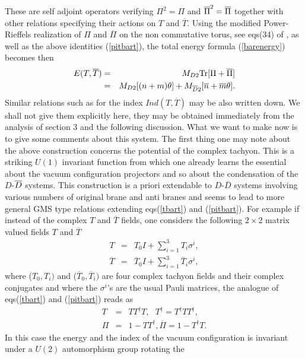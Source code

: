 \documentclass[a4paper,12pt]{article}
\begin{document}
These are self adjoint operators verifying $\Pi ^{2}=\Pi $ and $\overline{%
\Pi }^{2}=\overline{\Pi }$ together with other relations
specifying their actions on $T$ and $\overline{T}$. Using the
modified Power-Rieffels realization of $\Pi $ and $\overline{\Pi
}$ on the non commutative torus, see eqs(34) of \cite{g}, as well
as the above identities (\ref{pitbart}), the total energy formula
(\ref{barenergy}) becomes then
\begin{eqnarray*}
E(T,\overline{T}) &=&M_{D2}{\rm Tr}[\Pi +\overline{\Pi }] \\
&=&M_{D2}[(n+m)\theta
]+M_{\overline{D}2}[\overline{n}+\overline{m}\theta ].
\end{eqnarray*}
Similar relations such as for the index $Ind(T,\overline{T})$ may
be also written down. We shall not give them explicitly here, they
may be obtained immediately from the analysis of section 3 and the
following discussion. What we want to make now is to give some
comments about this system. The first thing one may note about the
above construction concerns the potential of the complex tachyon.
This is a striking $U(1)$ invariant function from which one
already learns the essential about the vacuum
configuration projectors and so about the condensation of the $D$-$\overline{%
D}$ systems. This construction is a priori extendable to
$D$-$\overline{D}$ systems involving various numbers of original
brane and anti branes and seems to lead to more general GMS type
relations extending eqs(\ref{tbart}) and (\ref{pitbart}). For
example if instead of the complex $T$ and $\overline{T}$ fields,
one
considers the following $2\times 2$ matrix valued fields $T$ and $\overline{T}$%
\begin{eqnarray*}
T &=&T_{0}I+\sum_{i=1}^{3}T_{i}\sigma ^{i}, \\ \overline{T}
&=&\overline{T}_{0}I+\sum_{i=1}^{3}\overline{T}_{i}\sigma ^{i},
\end{eqnarray*}
where ($T_{0},T_{i})$ and ($\overline{T}_{0},\overline{T}_{i})$
are four complex tachyon fields and their complex conjugates and
where the $\sigma ^{i}$'s are the usual Pauli matrices, the
analogue of eqs(\ref{tbart}) and (\ref{pitbart}) reads as
\begin{eqnarray*}
T &=&TT^{\dagger }T,\text{ \ \ }T^{\dagger }=T^{\dagger }TT^{\dagger }, \\
\Pi &=&1-TT^{\dagger },\overline{\Pi }=1-T^{\dagger }T.
\end{eqnarray*}
In this case the energy and the index of the vacuum configuration
is invariant under a $U(2)$ automorphism group rotating the
\end{document}
